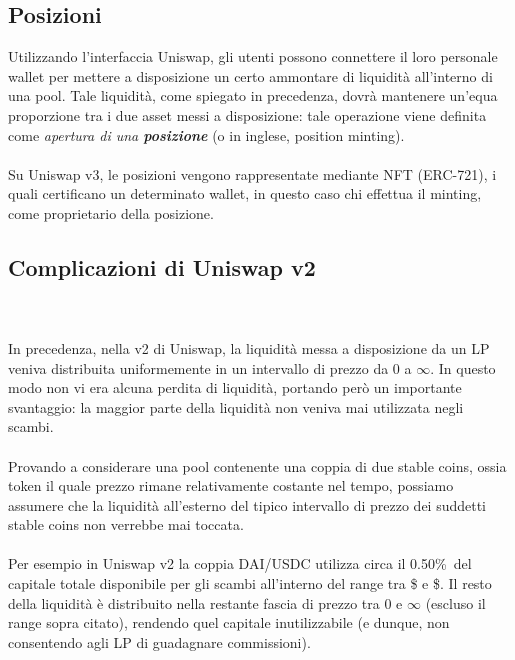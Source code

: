 \documentclass{report}
\begin{document}
\subsection{Posizioni}

Utilizzando l'interfaccia Uniswap, gli utenti possono connettere il loro personale wallet per mettere a disposizione un certo ammontare di liquidità all'interno di una pool.
Tale liquidità, come spiegato in precedenza, dovrà mantenere un'equa proporzione tra i due asset messi a disposizione: tale operazione viene definita come \textit{apertura di una \textbf{posizione}} (o in inglese, position minting).
\\\\Su Uniswap v3, le posizioni vengono rappresentate mediante NFT (ERC-721\cite{erc_721}), i quali certificano un determinato wallet, in questo caso chi effettua il minting, come proprietario della posizione.

\subsection{Complicazioni di Uniswap v2}

\\\\In precedenza, nella v2 di Uniswap, la liquidità messa a disposizione da un LP veniva distribuita uniformemente in un intervallo di prezzo da 0 a $\infty$.
In questo modo non vi era alcuna perdita di liquidità, portando però un importante svantaggio: la maggior parte della liquidità non veniva mai utilizzata negli scambi.
\\\\Provando a considerare una pool contenente una coppia di due stable coins, ossia token il quale prezzo rimane relativamente costante nel tempo, possiamo assumere che la liquidità all'esterno del tipico intervallo di prezzo dei suddetti stable coins non verrebbe mai toccata.
\\\\Per esempio in Uniswap v2 la coppia DAI/USDC utilizza circa il 0.50\%\ del capitale totale disponibile per gli scambi all'interno del range tra \$ e \$\cite{v2_waste}. Il resto della liquidità è distribuito nella restante fascia di prezzo tra 0 e $\infty$ (escluso il range sopra citato), rendendo quel capitale inutilizzabile (e dunque, non consentendo agli LP di guadagnare commissioni). 
\end{document}

